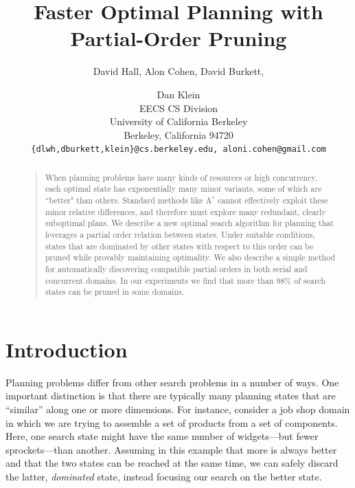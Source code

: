 \documentclass[letterpaper]{article}
\theoremstyle{plain} \newtheorem{theorem}{Theorem} \newtheorem{proposition}{Proposition} \newtheorem{lemma}{Lemma}
\theoremstyle{definition} \newtheorem{definition}{Definition} \newtheorem{conjecture}{Conjecture} \newtheorem*{example}{Example}
\theoremstyle{remark} \newtheorem*{remark}{Remark} \newtheorem*{note}{Note} \newtheorem{case}{Case}
\newcommand{\Astar}{A$^*$ }
\begin{document}
%
\title{Faster Optimal Planning with Partial-Order Pruning}
\author{David Hall, Alon Cohen, David Burkett, \and Dan Klein \\
EECS CS Division\\
University of California Berkeley\\
Berkeley, California 94720\\
{\tt\{dlwh,dburkett,klein\}@cs.berkeley.edu, aloni.cohen@gmail.com}
}


\maketitle
\begin{abstract}
\begin{quote}
  When planning problems have many kinds of resources or high
  concurrency, each optimal state has exponentially many minor
  variants, some of which are ``better" than others. Standard methods
  like \Astar cannot effectively exploit these minor relative differences,
  and therefore must explore many redundant, clearly suboptimal
  plans. We describe a new optimal search algorithm for planning
  that leverages a partial order relation between states. Under
  suitable conditions, states that are dominated by other states with
  respect to this order can be pruned while provably maintaining
  optimality. We also describe a simple method for automatically
  discovering compatible partial orders in both serial and concurrent
  domains. In our experiments we find that more than 98\% of search
  states can be pruned in some domains.
\end{quote}
\end{abstract}

\section{Introduction}

Planning problems differ from other search problems in a number of
ways. One important distinction is that there are typically many
planning states that are ``similar'' along one or more dimensions.
For instance, consider a job shop domain in which we are
trying to assemble a set of products from a set of components. Here,
one search state might have the same number of widgets---but fewer
sprockets---than another. Assuming in this example that more is
always better and that the two states can be reached at the same
time, we can safely discard the latter, \textit{dominated} state,
instead focusing our search on the better state.
\end{document}
